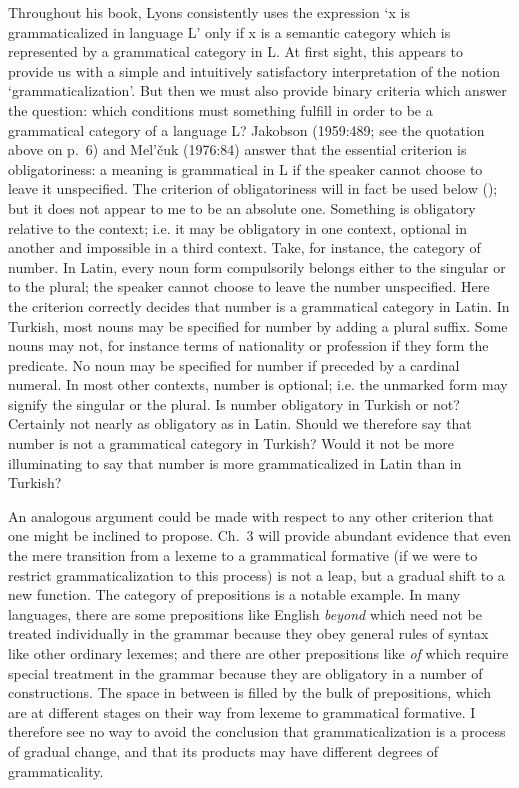Throughout his book, Lyons consistently uses the expression ‘x is grammaticalized in language L’ only if x is a semantic category which is represented by a grammatical category in L. At first sight, this appears to provide us with a simple and intuitively satisfactory interpretation of the notion ‘grammaticalization’. But then we must also provide binary criteria which answer the question: which conditions must something fulfill in order to be a grammatical category of a language L? Jakobson (1959:489; see the quotation above on p.~6) and Mel'čuk (1976:84) answer that the essential criterion is obligatoriness: a meaning is grammatical in L if the speaker cannot choose to leave it unspecified. The criterion of obligatoriness will in fact be used below (); but it does not appear to me to be an absolute one. Something is obligatory relative to the context; i.e. it may be obligatory in one context, optional in another and impossible in a third context. Take, for instance, the category of number. In Latin, every noun form compulsorily belongs either to the singular or to the plural; the speaker cannot choose to leave the number unspecified. Here the criterion correctly decides that number is a grammatical category in Latin. In Turkish, most nouns may be specified for number by adding a plural suffix. Some nouns may not, for instance terms of nationality or profession if they form the predicate. No noun may be specified for number if preceded by a cardinal numeral. In most other contexts, number is optional; i.e. the unmarked form may signify the singular or the plural. Is number obligatory in Turkish or not? Certainly not nearly as obligatory as in Latin. Should we therefore say that number is not a grammatical category in Turkish? Would it not be more illuminating to say that number is more grammaticalized in Latin than in Turkish?

An analogous argument could be made with respect to any other criterion that one might be inclined to propose. Ch.~3 will provide abundant evidence that even the mere transition from a lexeme to a grammatical formative (if we were to restrict grammaticalization to this process) is not a leap, but a gradual shift to a new function. The category of prepositions is a notable example. In many languages, there are some prepositions like English \textit{beyond} which need not be treated individually in the grammar because they obey general rules of syntax like other ordinary lexemes; and there are other prepositions like \textit{of} which require special treatment in the grammar because they are obligatory in a number of constructions. The space in between is filled by the bulk of prepositions, which are at different stages on their way from lexeme to grammatical formative. I therefore see no way to avoid the conclusion that grammaticalization is a process of gradual change, and that its products may have different degrees of grammaticality.

